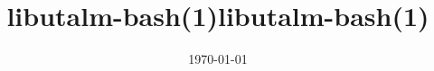 \documentclass{article}
\title{libutalm-bash(1)}
\date{\today}
\title{\textbf{libutalm-bash(1)}}
\begin{document}
\maketitle
\extpdfcontent
 
\newpage
\end{document}
